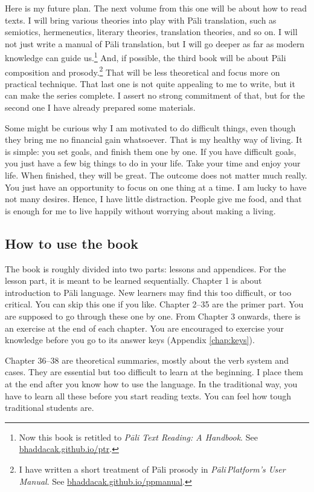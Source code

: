 Here is my future plan. The next volume from this one will be about how to read texts. I will bring various theories into play with P\=ali translation, such as semiotics, hermeneutics, literary theories, translation theories, and so on. I will not just write a manual of P\=ali translation, but I will go deeper as far as modern knowledge can guide us.\footnote{Now this book is retitled to \emph{P\=ali Text Reading: A Handbook}. See \url{bhaddacak.github.io/ptr}.} And, if possible, the third book will be about P\=ali composition and prosody.\footnote{I have written a short treatment of Pāli prosody in \textit{Pāli\,Platform's User Manual}. See \url{bhaddacak.github.io/ppmanual}.} That will be less theoretical and focus more on practical technique. That last one is not quite appealing to me to write, but it can make the series complete. I assert no strong commitment of that, but for the second one I have already prepared some materials.

Some might be curious why I am motivated to do difficult things, even though they bring me no financial gain whatsoever. That is my healthy way of living. It is simple: you set goals, and finish them one by one. If you have difficult goals, you just have a few big things to do in your life. Take your time and enjoy your life. When finished, they will be great. The outcome does not matter much really. You just have an opportunity to focus on one thing at a time. I am lucky to have not many desires. Hence, I have little distraction. People give me food, and that is enough for me to live happily without worrying about making a living.

\subsection*{How to use the book}

The book is roughly divided into two parts: lessons and appendices. For the lesson part, it is meant to be learned sequentially. Chapter 1 is about introduction to P\=ali language. New learners may find this too difficult, or too critical. You can skip this one if you like. Chapter 2--35 are the primer part. You are supposed to go through these one by one. From Chapter 3 onwards, there is an exercise at the end of each chapter. You are encouraged to exercise your knowledge before you go to its answer keys (Appendix \ref{chap:keys}).

Chapter 36--38 are theoretical summaries, mostly about the verb system and cases. They are essential but too difficult to learn at the beginning. I place them at the end after you know how to use the language. In the traditional way, you have to learn all these before you start reading texts. You can feel how tough traditional students are.

